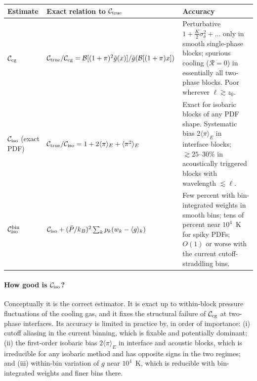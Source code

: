 \documentclass[11pt]{article}
\newcommand{\B}{\mathcal{B}}
\newcommand{\Ctrue}{\mathcal{C}_{\rm true}}
\newcommand{\Ccg}{\mathcal{C}_{\rm cg}}
\newcommand{\Ciso}{\mathcal{C}_{\rm iso}}
\newcommand{\Cbin}{\mathcal{C}_{\rm iso}^{\rm bin}}
\begin{document}
\begin{center}
\renewcommand{\arraystretch}{1.3}
\begin{tabular}{>{\raggedright}p{2.4cm}>{\raggedright}p{5.4cm}>{\raggedright\arraybackslash}p{6.2cm}}
\toprule
Estimate & Exact relation to $\Ctrue$ & Accuracy\\
\midrule
$\Ccg$ & $\Ctrue/\Ccg=\B[(1+\pi)^2\tilde g(x)]/\tilde g(\B[(1+\pi)x])$ &
Perturbative $1+\tfrac K2\sigma_\delta^2+\dots$ only in smooth single-phase blocks; spurious cooling ($\mathcal R=0$) in essentially all two-phase blocks. Poor wherever $\ell\gtrsim z_0$.\\
$\Ciso$ (exact PDF) & $\Ctrue/\Ciso=1+2\langle\pi\rangle_E+\langle\pi^2\rangle_E$ &
Exact for isobaric blocks of any PDF shape. Systematic bias $2\langle\pi\rangle_E$ in interface blocks; $\gtrsim25$--$30\%$ in acoustically triggered blocks with wavelength $\lesssim\ell$.\\
$\Cbin$ & $\Ciso+(\bar P/k_B)^2\sum_kp_k(w_k-\langle g\rangle_k)$ &
Few percent with bin-integrated weights in smooth bins; tens of percent near $10^4$~K for spiky PDFs; $O(1)$ or worse with the current cutoff-straddling bins.\\
\bottomrule
\end{tabular}
\end{center}

\paragraph{How good is $\Ciso$?} Conceptually it is the correct estimator. It is exact up to within-block pressure fluctuations of the cooling gas, and it fixes the structural failure of $\Ccg$ at two-phase interfaces. Its accuracy is limited in practice by, in order of importance: (i) cutoff aliasing in the current binning, which is fixable and potentially dominant; (ii) the first-order isobaric bias $2\langle\pi\rangle_E$ in interface and acoustic blocks, which is irreducible for any isobaric method and has opposite signs in the two regimes; and (iii) within-bin variation of $g$ near $10^4$~K, which is reducible with bin-integrated weights and finer bins there.
\end{document}

